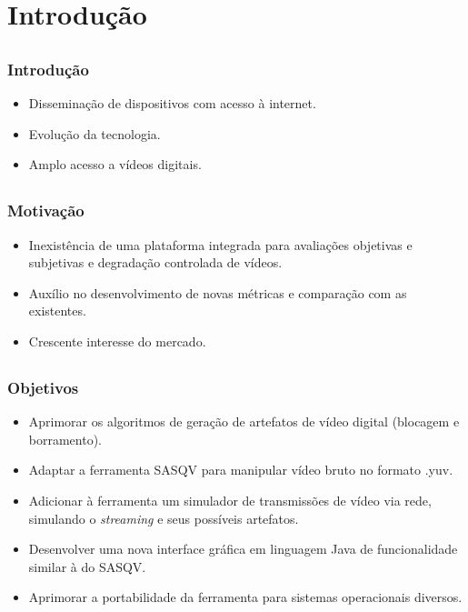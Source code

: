 \section{Introdução}


\subsection{}
    \begin{frame}\frametitle{Introdução}
        \begin{itemize}
            \item Disseminação de dispositivos com acesso à internet. %
            \item Evolução da tecnologia. %
            \item Amplo acesso a vídeos digitais. %
        \end{itemize}
    \end{frame}

\subsection{}
    \begin{frame}\frametitle{Motivação}
        \begin{itemize}
            \item Inexistência de uma plataforma integrada para avaliações objetivas e subjetivas e degradação controlada de vídeos.
            \item Auxílio no desenvolvimento de novas métricas e comparação com as existentes.
            \item Crescente interesse do mercado.
        \end{itemize}
    \end{frame}

\subsection{}
    \begin{frame}\frametitle{Objetivos}
        \begin{itemize}
            \item Aprimorar os algoritmos de geração de artefatos de vídeo digital (blocagem e borramento). %
            \item Adaptar a ferramenta SASQV para manipular vídeo bruto no formato .yuv.
            \item Adicionar à ferramenta um simulador de transmissões de vídeo via rede, simulando o \emph{streaming} e seus possíveis artefatos.
            \item Desenvolver uma nova interface gráfica em linguagem Java de funcionalidade similar à do SASQV.
            \item Aprimorar a portabilidade da ferramenta para sistemas operacionais diversos.
        \end{itemize}
    \end{frame}
    
